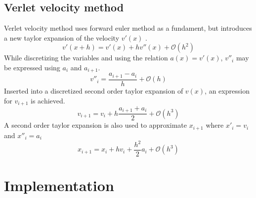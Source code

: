 \documentclass[twoside,twocolumn]{article}
\begin{document}
\subsection{Verlet velocity method}
Verlet velocity method uses forward euler method as a fundament, but introduces a new taylor expansion of the velocity $v'(x)$ .
\begin{equation*}
v'(x+h)=v'(x)+hv''(x)+\mathcal{O}(h^2)
\end{equation*}
While discretizing the variables and using the relation $a(x)=v'(x)$, $v''_i$ may be expressed using $a_i$ and $a_{i+1}$.
\begin{equation*}
v''_i=\frac{a_{i+1}-a_i}{h}+\mathcal{O}(h) 
\end{equation*}
Inserted into a discretized second order taylor expansion of $v(x)$, an expression for $v_{i+1}$ is achieved.
\begin{equation}
v_{i+1}=v_i+h\frac{a_{i+1}+a_i}{2} + \mathcal{O}(h^3)
\end{equation}
A second order taylor expansion is also used to approximate $x_{i+1}$ where $x'_i=v_i$ and $x''_i=a_i$
\begin{equation}
x_{i+1}=x_i+hv_i+\frac{h^2}{2}a_i + \mathcal{O}(h^3)
\end{equation}

\newpage
\section{Implementation}
\label{sec:implementation}
\end{document}
